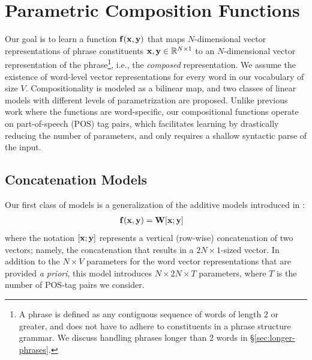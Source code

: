 \documentclass[11pt,letterpaper]{article}
\newcommand{\bX}{{\bf x}}
\newcommand{\bY}{{\bf y}}
\newcommand{\bF}{{\bf f}}
\newcommand{\bW}{{\bf W}}
\begin{document}
\section{Parametric Composition Functions}
\label{sec:learning}

Our goal is to learn a function $\bF (\bX, \bY)$ that maps $N$-dimensional vector representations of phrase constituents $\bX, \bY \in \mathbb{R}^{N \times 1}$  to an $N$-dimensional vector representation of the phrase\footnote{A phrase is defined as any contiguous sequence of words of length 2 or greater, and does not have to adhere to constituents in a phrase structure grammar. We discuss handling phrases longer than 2 words in \S\ref{sec:longer-phrases}.}, i.e., the \emph{composed} representation. 
We assume the existence of word-level vector representations for every word in our vocabulary of size $V$.
Compositionality is modeled as a bilinear map, and two classes of linear models with different levels of parametrization are proposed.  
Unlike previous work \cite[\emph{inter alia}]{Baroni2010,Socher2013,Grefenstette2013} where the functions are  word-specific, our compositional functions operate on part-of-speech (POS) tag pairs, which facilitates learning by drastically reducing the number of parameters, and only requires a shallow syntactic parse of the input. 

\subsection{Concatenation Models}
\label{sec:concat}

Our first class of models is a generalization of the additive models introduced in :
\begin{align}
	\bF (\bX, \bY) &= \bW [\bX;\bY]
	\label{eq:concat}
\end{align}
where the notation $[\bX; \bY]$ represents a vertical (row-wise) concatenation of two vectors; namely, the concatenation that results in a $2N \times 1$-sized vector.  
In addition to the $N \times V$ parameters for the word vector representations that are provided \emph{a priori}, this model introduces $N \times 2N \times T$ parameters, where $T$ is the number of POS-tag pairs we consider.  
\end{document}
